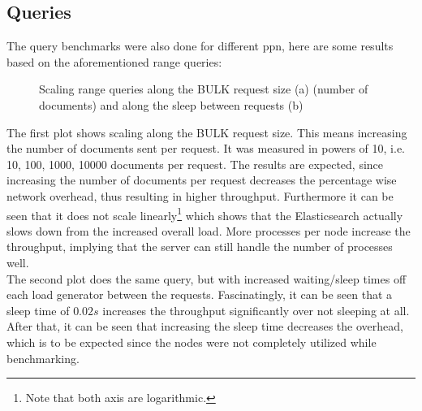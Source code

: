 \subsection{Queries}
The query benchmarks were also done for different ppn, here are some results based on the aforementioned range queries:

\begin{figure}[H]%
    \centering
    \qquad
    \caption{Scaling range queries along the BULK request size (a) (number of documents) and along the sleep between requests (b)}%
\end{figure}
The first plot shows scaling along the BULK request size. This means increasing the number of documents sent per request. It was measured in powers of 10, i.e. 10, 100, 1000, 10000 documents per request. The results are expected, since increasing the number of documents per request decreases the percentage wise network overhead, thus resulting in higher throughput. Furthermore it can be seen that it does not scale linearly\footnote{Note that both axis are logarithmic.} which shows that the Elasticsearch actually slows down from the increased overall load. More processes per node increase the throughput, implying that the server can still handle the number of processes well.\\

The second plot does the same query, but with increased waiting/sleep times off each load generator between the requests. Fascinatingly, it can be seen that a sleep time of $0.02s$ increases the throughput significantly over not sleeping at all. After that, it can be seen that increasing the sleep time decreases the overhead, which is to be expected since the nodes were not completely utilized while benchmarking.


